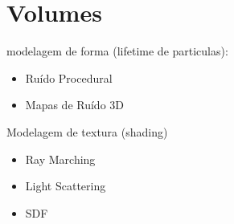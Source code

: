 \section{Volumes}
modelagem de forma (lifetime de particulas):
\begin{itemize}
\item Ruído Procedural
\item Mapas de Ruído 3D
\end{itemize}

Modelagem de textura (shading)
\begin{itemize}
  \item Ray Marching
  \item Light Scattering 
  \item SDF
\end{itemize}
